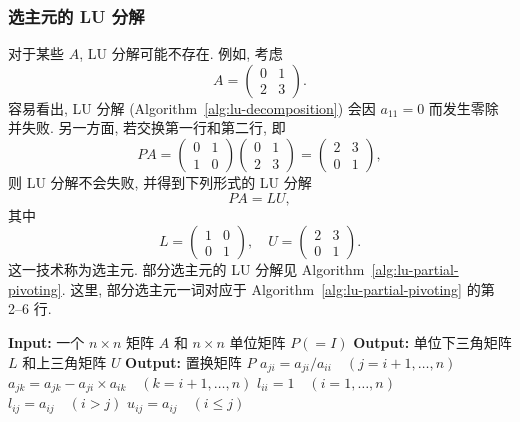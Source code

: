 \subsubsection{{选主元的 LU 分解}}\label{subsec:lu-pivoting}
{对于某些 $A$, LU 分解可能不存在. 例如, 考虑}
\[
A=\begin{pmatrix}0&1\\2&3\end{pmatrix}.
\]
{容易看出, LU 分解 (Algorithm~\ref{alg:lu-decomposition}) 会因 $a_{11}=0$ 而发生零除并失败. 另一方面, 若交换第一行和第二行, 即}
\[
PA=\begin{pmatrix}0&1\\1&0\end{pmatrix}\begin{pmatrix}0&1\\2&3\end{pmatrix}
=\begin{pmatrix}2&3\\0&1\end{pmatrix},
\]
{则 LU 分解不会失败, 并得到下列形式的 LU 分解}
\[PA=LU,\]
{其中}
\[
L=\begin{pmatrix}1&0\\0&1\end{pmatrix},\quad U=\begin{pmatrix}2&3\\0&1\end{pmatrix}.
\]
{这一技术称为选主元.}
{部分选主元的 LU 分解见 Algorithm~\ref{alg:lu-partial-pivoting}. 这里, 部分选主元一词对应于 Algorithm~\ref{alg:lu-partial-pivoting} 的第 2--6 行.}
\begin{algorithm}[H]
\caption{{部分选主元的 LU 分解}}\label{alg:lu-partial-pivoting}
\begin{algorithmic}[1]
\Statex \textbf{Input:} {一个 $n\times n$ 矩阵 $A$ 和 $n\times n$ 单位矩阵 $P(=I)$}
\Statex \textbf{Output:} {单位下三角矩阵 $L$ 和上三角矩阵 $U$}
\Statex \textbf{Output:} {置换矩阵 $P$}
\EndIf
\State $a_{ji}=a_{ji}/a_{ii}\quad(j=i+1,\ldots,n)$
\State $a_{jk}=a_{jk}-a_{ji}\times a_{ik}\quad(k=i+1,\ldots,n)$
\EndFor
\EndFor
\State $l_{ii}=1\quad(i=1,\ldots,n)$
\State $l_{ij}=a_{ij}\quad(i>j)$
\State $u_{ij}=a_{ij}\quad(i\le j)$
\end{algorithmic}
\end{algorithm}
